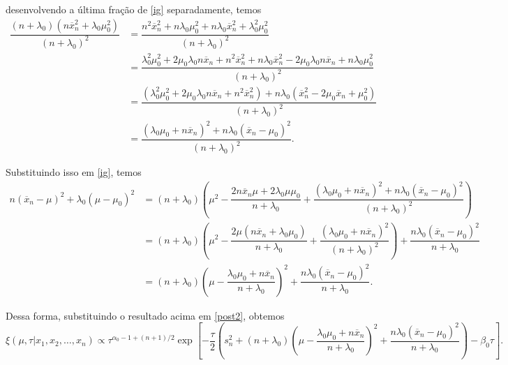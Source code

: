\documentclass{article}
\begin{document}
\noindent desenvolvendo a última fração de \ref{ig} separadamente, temos
\begin{equation*}
    \begin{split}
        \dfrac{\left(n + \lambda_0\right)\left(n\overline{x}_n^2 + \lambda_0\mu_0^2\right)}{\left(n + \lambda_0\right)^2} & = \dfrac{n^2\overline{x}_n^2 + n\lambda_0\mu_0^2 + n\lambda_0\overline{x}_n^2 + \lambda_0^2\mu_0^2}{\left(n + \lambda_0\right)^2} \\
        & = \dfrac{\lambda_0^2\mu_0^2 + 2\mu_0\lambda_0n\overline{x}_n + n^2\overline{x}_n^2 + n\lambda_0\overline{x}_n^2 - 2\mu_0\lambda_0n\overline{x}_n + n\lambda_0\mu_0^2}{\left(n + \lambda_0\right)^2} \\
        & = \dfrac{\left(\lambda_0^2\mu_0^2 + 2\mu_0\lambda_0n\overline{x}_n + n^2\overline{x}_n^2\right) + n\lambda_0 \left(\overline{x}_n^2 - 2\mu_0\overline{x}_n + \mu_0^2\right)}{\left(n + \lambda_0\right)^2} \\
        & = \dfrac{\left(\lambda_0\mu_0 + n\overline{x}_n\right)^2 + n\lambda_0 \left(\overline{x}_n - \mu_0\right)^2}{\left(n + \lambda_0\right)^2}.
    \end{split}
\end{equation*}

Substituindo isso em \ref{ig}, temos
\begin{equation*}
    \begin{split}
        n\left(\overline{x}_n - \mu\right)^2 + \lambda_0\left(\mu - \mu_0\right)^2 & = (n + \lambda_0)\left(\mu^2 - \dfrac{2n\overline{x}_n\mu + 2\lambda_0\mu\mu_0}{n + \lambda_0} + \dfrac{\left(\lambda_0\mu_0 + n\overline{x}_n\right)^2 +  n\lambda_0 \left(\overline{x}_n - \mu_0\right)^2}{\left(n + \lambda_0\right)^2}\right) \\
        & = (n + \lambda_0)\left(\mu^2 - \dfrac{2\mu \left(n\overline{x}_n + \lambda_0\mu_0\right)}{n + \lambda_0} + \dfrac{\left(\lambda_0\mu_0 + n\overline{x}_n\right)^2}{\left(n + \lambda_0\right)^2}\right) + \dfrac{n\lambda_0 \left(\overline{x}_n - \mu_0\right)^2}{n + \lambda_0} \\
        & = (n + \lambda_0)\left(\mu - \dfrac{\lambda_0\mu_0 + n\overline{x}_n}{n + \lambda_0}\right)^2 + \dfrac{n\lambda_0 \left(\overline{x}_n - \mu_0\right)^2}{n + \lambda_0}.
    \end{split}
\end{equation*}

Dessa forma, substituindo o resultado acima em \ref{post2}, obtemos
\begin{equation*}
    \xi(\mu, \tau | x_1, x_2, \dots, x_n) \propto \tau^{\alpha_0 - 1 + (n + 1)/2} \exp{\left[-\dfrac{\tau}{2}\left(s_n^2 + (n + \lambda_0)\left(\mu - \dfrac{\lambda_0\mu_0 + n\overline{x}_n}{n + \lambda_0}\right)^2 + \dfrac{n\lambda_0 \left(\overline{x}_n - \mu_0\right)^2}{n + \lambda_0}\right) - \beta_0 \tau\right]}.
\end{equation*}
\end{document}
